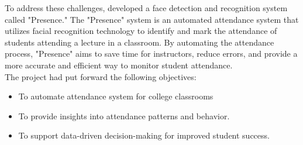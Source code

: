 To address these challenges, developed a face detection and recognition system called "Presence." The "Presence" system is an automated attendance system that utilizes facial recognition technology to identify and mark the attendance of students attending a lecture in a classroom. By automating the attendance process, "Presence" aims to save time for instructors, reduce errors, and provide a more accurate and efficient way to monitor student attendance.\\

The project had put forward the following objectives:

\begin{itemize}
	\item To automate attendance system for college classrooms
	\item To provide insights into attendance patterns and behavior.
        \item To support data-driven decision-making for improved student success.
  
\end{itemize}